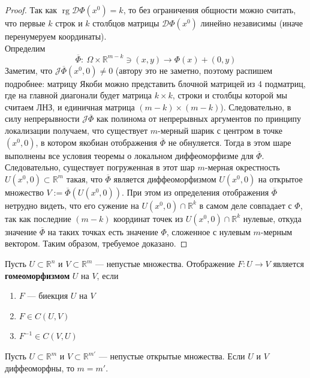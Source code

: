 \documentclass[11pt]{article}
\DeclareMathOperator{\rg}{rg}
\begin{document}
\begin{proof}
    Так как $\rg \mathcal{D}\Phi(x^0) = k$, то без ограничения общности можно считать, что первые 
    $k$ строк и $k$ столбцов матрицы $\mathcal{D}\Phi(x^0)$ линейно независимы (иначе перенумеруем 
    координаты). \\ Определим 
    \[\overline{\Phi}: \ \Omega \times \mathbb{R}^{m-k} \ni (x, y) \to \Phi(x) + (0, y)\]
    Заметим, что $\mathcal{J} \overline{\Phi}(x^0, 0) \ne 0$ (автору это не заметно, поэтому распишем подробнее:
    матрицу Якоби можно представить блочной матрицей из 4 подматриц, где на главной диагонали
    будет матрица $k \times k$, строки и столбцы которой мы считаем ЛНЗ, и единичная матрица 
    $(m - k) \times (m - k)$). Следовательно, в силу непрерывности $\mathcal{J} \overline{\Phi}$ как полинома от непрерывных аргументов по принципу локализации получаем, что существует $m$-мерный шарик с центром в точке $(x^0, 0)$, в котором якобиан отображения $\overline{\Phi}$ не обнуляется. Тогда в этом шаре выполнены все условия теоремы о локальном диффеоморфизме для $\overline{\Phi}$. Следовательно, существует погруженная в этот шар $m$-мерная окрестность $U(x^0, 0) \subset \mathbb{R}^m$ такая, что $\overline{\Phi}$ является диффеоморфизмом $U(x^0, 0)$ на открытое множество $V := \overline{\Phi} \left(U(x^0, 0)\right)$.
    При этом из определения отображения $\overline{\Phi}$ нетрудно видеть, что его сужение на $U(x^0, 0) \cap \mathbb{R}^k$ в самом деле совпадает с $\Phi$, так как последние $(m - k)$ координат точек из $U(x^0, 0) \cap \mathbb{R}^k$ нулевые, откуда значение $\overline{\Phi}$ на таких точках есть значение $\Phi$, сложенное с нулевым $m$-мерным вектором. Таким образом, требуемое доказано.
\end{proof}

\begin{definition}
    Пусть $U \subset \mathbb{R}^n$ и $V \subset \mathbb{R}^m$ --- непустые множества. Отображение $F \colon U \to V$ является \textbf{гомеоморфизмом} $U$ на $V$, если
    \begin{enumerate}
        \item $F$ --- биекция $U$ на $V$
        \item $F \in C \left(U, V\right)$
        \item $F^{-1} \in C \left(V, U\right)$
    \end{enumerate}
\end{definition}

\begin{lemma} \label{lemma:2.1}
    Пусть $U \subset \mathbb{R}^m$ и $V \subset \mathbb{R}^{m'}$ --- непустые открытые множества. Если $U$ и $V$ диффеоморфны, то $m = m'$.
\end{lemma}
\end{document}
